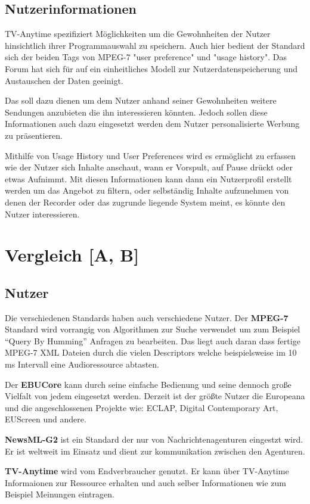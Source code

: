 \subsection{Nutzerinformationen} 
	TV-Anytime spezifiziert Möglichkeiten um die Gewohnheiten der Nutzer hinsichtlich ihrer Programmauswahl zu speichern. Auch hier bedient der Standard sich der beiden Tags von MPEG-7 "user preference" und "usage history". Das Forum hat sich für auf ein einheitliches Modell zur Nutzerdatenspeicherung und Austauschen der Daten geeinigt.
	
	Das soll dazu dienen um dem Nutzer anhand seiner Gewohnheiten weitere Sendungen anzubieten die ihn interessieren könnten. Jedoch sollen diese Informationen auch dazu eingesetzt werden dem Nutzer personalisierte Werbung zu präsentieren.
	
	Mithilfe von Usage History und User Preferences wird es ermöglicht zu erfassen wie der Nutzer sich Inhalte anschaut, wann er Vorspult, auf Pause drückt oder etwas Aufnimmt. Mit diesen Informationen kann dann ein Nutzerprofil erstellt werden um das Angebot zu filtern, oder selbständig Inhalte aufzunehmen von denen der Recorder oder das zugrunde liegende System meint, es könnte den Nutzer interessieren.

	\section{Vergleich [A, B]}
	\subsection{Nutzer}
	Die verschiedenen Standards haben auch verschiedene Nutzer. Der \textbf{MPEG-7} Standard wird vorrangig von Algorithmen zur Suche verwendet um zum Beispiel \enquote{Query By Humming} Anfragen zu bearbeiten. Das liegt auch daran dass fertige MPEG-7 XML Dateien durch die vielen Descriptors welche beispielsweise im 10 ms Intervall eine Audioressource abtasten.
	
	Der \textbf{EBUCore} kann durch seine einfache Bedienung und seine dennoch große Vielfalt von jedem eingesetzt werden. Derzeit ist der größte Nutzer die Europeana und die angeschlossenen Projekte wie: ECLAP, Digital Contemporary Art, EUScreen und andere.
	
	\textbf{NewsML-G2} ist ein Standard der nur von Nachrichtenagenturen eingestzt wird. Er ist weltweit im Einsatz und dient zur kommunikation zwischen den Agenturen.
	
	\textbf{TV-Anytime} wird vom Endverbraucher genutzt. Er kann über TV-Anytime Informaionen zur Ressource erhalten und auch selber Informationen wie zum Beispiel Meinungen eintragen.

